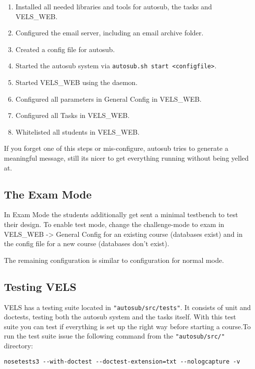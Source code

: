 \begin{enumerate}
\item Installed all needed libraries and tools for autosub, the tasks and VELS\_WEB.
\item Configured the email server, including an email archive folder.
\item Created a config file for autosub.
\item Started the autosub system via {\tt autosub.sh start <configfile>}.
\item Started VELS\_WEB using the daemon.
\item Configured all parameters in General Config in VELS\_WEB.
\item Configured all Tasks in VELS\_WEB.
\item Whitelisted all students in VELS\_WEB.
\end{enumerate}

If you forget one of this steps or mis-configure, autosub tries to generate a meaningful
message, still its nicer to get everything running without being yelled at.

\subsection{The Exam Mode}\label{sub:exammode}
In Exam Mode the students additionally get sent a minimal testbench to test their design.
To enable test mode, change the challenge-mode to exam in VELS\_WEB -> General Config for
an existing course (databases exist) and in the config file for a new course (databases
don't exist).

The remaining configuration is similar to configuration for normal mode.

\subsection{Testing VELS}\label{sub:testingvels}


VELS has a testing suite located in {\tt "autosub/src/tests"}. It consists of unit and
doctests, testing both the autosub system and the tasks itself. With this test suite you
can test if everything is set up the right way before starting a course.To run the test
suite issue the following command from the {\tt "autosub/src/"} directory:

\begin{verbatim}
nosetests3 --with-doctest --doctest-extension=txt --nologcapture -v
\end{verbatim}

